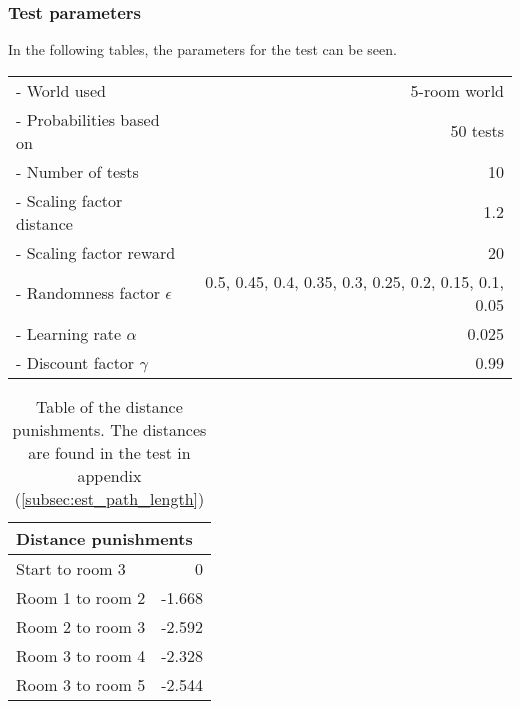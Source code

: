\documentclass[../Head/Main.tex]{subfiles}
\begin{document}
\subsubsection*{Test parameters}
In the following tables, the parameters for the test can be seen.\\
\begin{minipage}[c]{0.69\textwidth}
	\begin{tabular}{l r}
	- World used                   & 5-room world\\
	- Probabilities based on       & 50 tests\\	
	- Number of tests              & 10\\
	- Scaling factor distance      & 1.2\\
	- Scaling factor reward        & 20\\
	- Randomness factor $\epsilon$ & 0.5, 0.45, 0.4, 0.35, 0.3, 0.25, 0.2, 0.15, 0.1, 0.05\\
	- Learning rate $\alpha$       & 0.025\\
	- Discount factor $\gamma$     & 0.99\\
	\end{tabular}
\end{minipage}
\hfill
\begin{minipage}[c]{0.3\textwidth}
	\begin{table}[H]
	\centering
	\begin{tabular}{l r}
		\hline
		\multicolumn{2}{l}{\textbf{Distance punishments}}\\ 			\hline
		Start to room 3   & 0\\
		Room 1 to room 2  & -1.668\\
		Room 2 to room 3  & -2.592\\
		Room 3 to room 4  & -2.328\\
		Room 3 to room 5  & -2.544\\
		\hline
	\end{tabular}
	\caption{Table of the distance punishments. The distances are found in the test in appendix (\ref{subsec:est_path_length})}
	\label{tab:distance_punishment_5_rooms_2}
\end{table}
\end{minipage}

\clearpage
\end{document}
